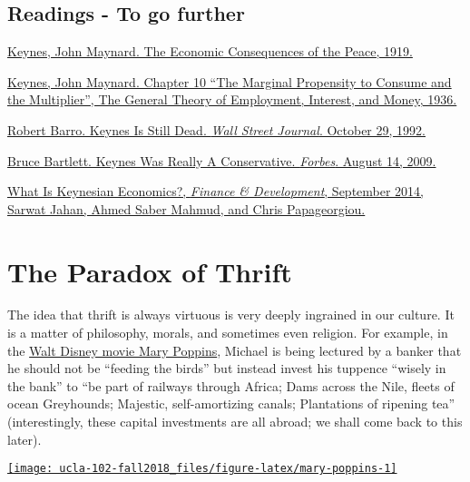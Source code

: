 \documentclass[]{book}
\theoremstyle{definition}
\theoremstyle{definition}
\theoremstyle{definition}
\theoremstyle{remark}
\begin{document}
\section*{Readings - To go further}\label{readings---to-go-further-4}

\href{https://socialsciences.mcmaster.ca/econ/ugcm/3ll3/keynes/pdf\%26filename\%3Dpeace3.pdf}{Keynes,
John Maynard. The Economic Consequences of the Peace, 1919.}

\href{https://cas2.umkc.edu/economics/people/facultypages/kregel/courses/econ645/winter2011/generaltheory.pdf}{Keynes,
John Maynard. Chapter 10 ``The Marginal Propensity to Consume and the
Multiplier'', The General Theory of Employment, Interest, and Money,
1936.}

\href{https://search.proquest.com/docview/398378701/fulltext/CBD1D9A468D04A85PQ/4?accountid=14512}{Robert
Barro. Keynes Is Still Dead. \emph{Wall Street Journal}. October 29,
1992.}

\href{https://www.forbes.com/2009/08/13/john-maynard-keynes-conservative-opinions-columnists-bruce-bartlett.html}{Bruce
Bartlett. Keynes Was Really A Conservative. \emph{Forbes}. August 14,
2009.}

\href{http://www.imf.org/external/pubs/ft/fandd/2014/09/pdf/basics.pdf}{What
Is Keynesian Economics?, \emph{Finance \& Development}, September 2014,
Sarwat Jahan, Ahmed Saber Mahmud, and Chris Papageorgiou.}

\hypertarget{paradox-thrift}{\chapter{The Paradox of
Thrift}\label{paradox-thrift}}

The idea that thrift is always virtuous is very deeply ingrained in our
culture. It is a matter of philosophy, morals, and sometimes even
religion. For example, in the
\href{https://www.youtube.com/watch?v=XxyB29bDbBA}{Walt Disney movie
Mary Poppins}, Michael is being lectured by a banker that he should not
be ``feeding the birds'' but instead invest his tuppence ``wisely in the
bank'' to ``be part of railways through Africa; Dams across the Nile,
fleets of ocean Greyhounds; Majestic, self-amortizing canals;
Plantations of ripening tea'' (interestingly, these capital investments
are all abroad; we shall come back to this later).

\begin{center}\href{https://www.youtube.com/embed/Hk23s4hh8M8}{\texttt{[image: ucla-102-fall2018\_files/figure-latex/mary-poppins-1]} }\end{center}
\end{document}
